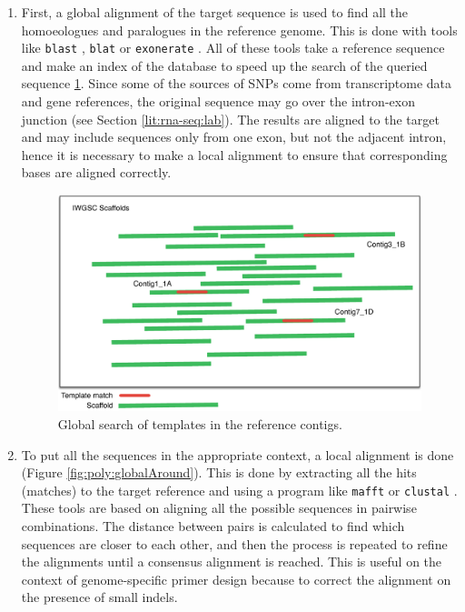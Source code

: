 \begin{enumerate}
\item First, a global alignment of the target sequence is used to find all the homoeologues and paralogues in the reference genome.
This is done with tools like \verb|blast| \citep{Altschul1990}, \verb|blat| \citep{Kent2002} or \verb|exonerate| \citep{Slater2005}.
All of these tools take a reference sequence and make an index of the database to speed up the search of the queried sequence  \ref{fig:poly:globalSearch}. 
Since some of the sources of SNPs come from transcriptome data and gene references, the original sequence may go over the intron-exon junction (see Section \ref{lit:rna-seq:lab}).  
The results are aligned to the target and may include sequences only from one exon, but not the adjacent intron, hence it is necessary to make a local alignment to ensure that corresponding bases are aligned correctly.

\begin{figure}
\centering
\includegraphics[width=1\textwidth]{PolyMarker/Figures/aln/scaffoldsSearch.pdf}
\caption{Global search of templates in the reference contigs.}
\label{fig:poly:globalSearch}
\end{figure}

\item To put all the sequences in the appropriate context, a local alignment is done (Figure \ref{fig:poly:globalAround}). 
This is done by extracting all the hits (matches) to the target reference and using a program like \verb|mafft| \citep{Katoh2013} or \verb|clustal| \citep{Higgins1988}. 
These tools are based on aligning all the possible sequences in pairwise combinations.
The distance between pairs is calculated to find which sequences are closer to each other, and then the process is repeated to refine the alignments until a consensus alignment is reached. 
This is useful on the context of genome-specific primer design because to correct the alignment on the presence of small \gls{indels}.  


\end{enumerate}
